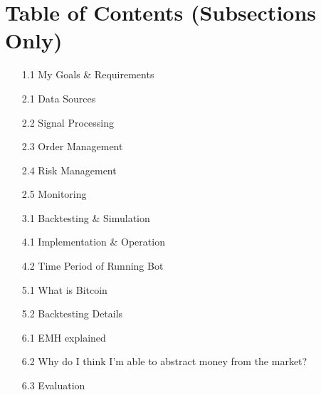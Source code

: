 \tableofcontents
\section*{Table of Contents (Subsections Only)}
\begin{enumerate}
  \item[1.1] My Goals \& Requirements

  \item[2.1] Data Sources
  \item[2.2] Signal Processing
  \item[2.3] Order Management
  \item[2.4] Risk Management
  \item[2.5] Monitoring

  \item[3.1] Backtesting \& Simulation

  \item[4.1] Implementation \& Operation
  \item[4.2] Time Period of Running Bot

  \item[5.1] What is Bitcoin
  \item[5.2] Backtesting Details

  \item[6.1] EMH explained
  \item[6.2] Why do I think I'm able to abstract money from the market?
  \item[6.3] Evaluation
\end{enumerate}
